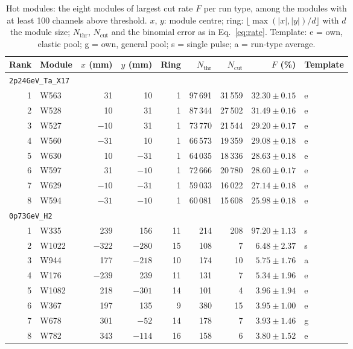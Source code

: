 \documentclass[11pt]{article}
\newcommand{\code}[1]{\texttt{#1}}
\begin{document}
\begin{table}[htbp]
\centering
\caption{Hot modules: the eight modules of largest cut rate $F$ per run type, among the modules with at least 100 channels above threshold. $x$, $y$: module centre; ring: $\lfloor \max(|x|, |y|) / d \rfloor$ with $d$ the module size; $N_{\mathrm{thr}}$, $N_{\mathrm{cut}}$ and the binomial error as in Eq.~\eqref{eq:rate}. Template: e = own, elastic pool; g = own, general pool; s = single pulse; a = run-type average.}
\label{tab:hot}
\footnotesize
\begin{tabular}{rlrrrrrrl}
\toprule
Rank & Module & $x$ (mm) & $y$ (mm) & Ring & $N_{\mathrm{thr}}$ & $N_{\mathrm{cut}}$ & $F$ (\%) & Template \\
\midrule
\multicolumn{9}{l}{\code{2p24GeV\_Ta\_X17}} \\
1 & W563 & 31 & 10 & 1 & 97\,691 & 31\,559 & $32.30 \pm 0.15$ & e \\
2 & W528 & 10 & 31 & 1 & 87\,344 & 27\,502 & $31.49 \pm 0.16$ & e \\
3 & W527 & $-10$ & 31 & 1 & 73\,770 & 21\,544 & $29.20 \pm 0.17$ & e \\
4 & W560 & $-31$ & 10 & 1 & 66\,573 & 19\,359 & $29.08 \pm 0.18$ & e \\
5 & W630 & 10 & $-31$ & 1 & 64\,035 & 18\,336 & $28.63 \pm 0.18$ & e \\
6 & W597 & 31 & $-10$ & 1 & 72\,666 & 20\,780 & $28.60 \pm 0.17$ & e \\
7 & W629 & $-10$ & $-31$ & 1 & 59\,033 & 16\,022 & $27.14 \pm 0.18$ & e \\
8 & W594 & $-31$ & $-10$ & 1 & 60\,081 & 15\,608 & $25.98 \pm 0.18$ & e \\
\midrule
\multicolumn{9}{l}{\code{0p73GeV\_H2}} \\
1 & W335 & 239 & 156 & 11 & 214 & 208 & $97.20 \pm 1.13$ & s \\
2 & W1022 & $-322$ & $-280$ & 15 & 108 & 7 & $6.48 \pm 2.37$ & s \\
3 & W944 & 177 & $-218$ & 10 & 174 & 10 & $5.75 \pm 1.76$ & a \\
4 & W176 & $-239$ & 239 & 11 & 131 & 7 & $5.34 \pm 1.96$ & e \\
5 & W1082 & 218 & $-301$ & 14 & 101 & 4 & $3.96 \pm 1.94$ & e \\
6 & W367 & 197 & 135 & 9 & 380 & 15 & $3.95 \pm 1.00$ & e \\
7 & W678 & 301 & $-52$ & 14 & 178 & 7 & $3.93 \pm 1.46$ & g \\
8 & W782 & 343 & $-114$ & 16 & 158 & 6 & $3.80 \pm 1.52$ & e \\

\end{tabular}
\end{table}
\end{document}
